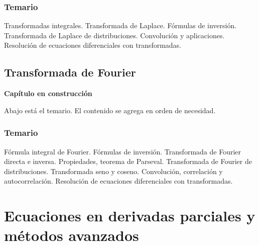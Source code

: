 \documentclass[
  spanish,
  a4paper,
]{scrbook}
\theoremstyle{definition}
\theoremstyle{plain}
\theoremstyle{definition}
\theoremstyle{plain}
\theoremstyle{definition}
\theoremstyle{remark}
\begin{document}
\section*{Temario}\label{temario-5}


Transformadas integrales. Transformada de Laplace. Fórmulas de
inversión. Transformada de Laplace de distribuciones. Convolución y
aplicaciones. Resolución de ecuaciones diferenciales con transformadas.

\chapter{Transformada de Fourier}\label{sec-tfourier}

\begin{tcolorbox}[enhanced jigsaw, arc=.35mm, bottomrule=.15mm, breakable, colback=white, colframe=quarto-callout-note-color-frame, left=2mm, leftrule=.75mm, opacityback=0, rightrule=.15mm, toprule=.15mm]
\begin{minipage}[t]{5.5mm}
\textcolor{quarto-callout-note-color}{\faInfo}
\end{minipage}%
\begin{minipage}[t]{\textwidth - 5.5mm}

\vspace{-3mm}\textbf{Capítulo en construcción}\vspace{3mm}

Abajo está el temario. El contenido se agrega en orden de necesidad.

\end{minipage}%
\end{tcolorbox}

\section*{Temario}\label{temario-6}


Fórmula integral de Fourier. Fórmulas de inversión. Transformada de
Fourier directa e inversa. Propiedades, teorema de Parseval.
Transformada de Fourier de distribuciones. Transformada seno y coseno.
Convolución, correlación y autocorrelación. Resolución de ecuaciones
diferenciales con transformadas.

\part{Ecuaciones en derivadas parciales y métodos avanzados}
\end{document}
